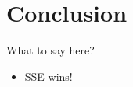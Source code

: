 \section{Conclusion}
\label{Conclusion}

What to say here?

\begin{itemize}
\item SSE wins!
\end{itemize}
